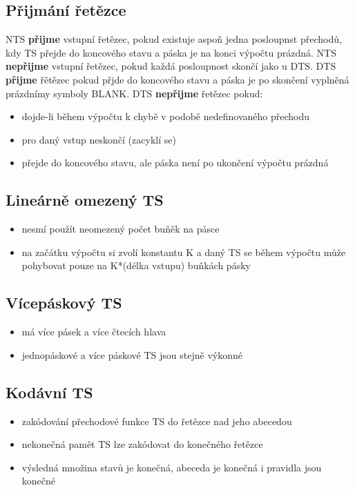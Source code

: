 \documentclass{szzclass}
\begin{document}
\subsection{Přijmání řetězce}
NTS \textbf{přijme} vstupní řetězec, pokud existuje aspoň jedna posloupnst přechodů, kdy TS přejde do koncového stavu a páska je na konci výpočtu prázdná.
\newline
NTS \textbf{nepřijme} vstupní řetězec, pokud každá posloupnost skončí jako u DTS.
\newline
\newline
DTS \textbf{přijme} řětězec pokud přjde do koncového stavu a páska je po skončení vyplněná prázdnímy symboly BLANK.
\newline
DTS \textbf{nepřijme} řetězec pokud:
\begin{itemize}
    \item dojde-li během výpočtu k chybě v podobě nedefinovaného přechodu
    \item pro daný vstup neskončí (zacyklí se)
    \item přejde do koncového stavu, ale páska není po ukončení výpočtu prázdná
\end{itemize}

\subsection{Lineárně omezený TS}
\begin{itemize}
	\item nesmí použít neomezený počet buňěk na pásce
	\item na začátku výpočtu si zvolí konstantu K a daný TS se během výpočtu může pohybovat pouze na K*(délka vstupu) buňkách pásky
\end{itemize}

\subsection{Vícepáskový TS}
\begin{itemize}
    \item má více pásek a více čtecích hlava
    \item jednopáskové a více páskové TS jsou stejně výkonné 
\end{itemize}
\subsection{Kodávní TS}
\begin{itemize}
    \item zakódování přechodové funkce TS do řetězce nad jeho abecedou
    \item nekonečná pamět TS lze zakódovat do konečného řetězce
    \item výsledná množina stavů je konečná, abeceda je konečná i pravidla jsou konečné
\end{itemize}
\end{document}

